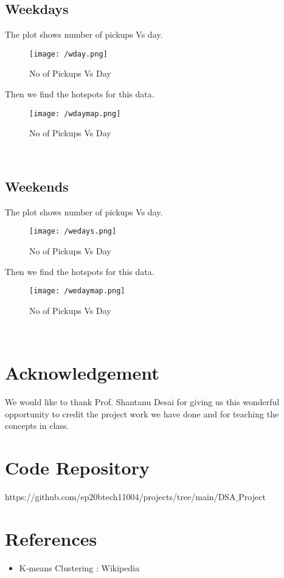 \documentclass[fleqn]{report}
\begin{document}
  	\subsection{Weekdays}
  	The plot shows number of pickups Vs day.
  	 \begin{figure}[!ht]
  		\centering
  		\texttt{[image: /wday.png]}
  		\caption{No of Pickups Vs Day}
  		\label{fig:wday}
  	\end{figure} 
  	Then we find the hotspots for this data.
  	  	 \begin{figure}[!ht]
  		\centering
  		\texttt{[image: /wdaymap.png]}
  		\caption{No of Pickups Vs Day}
  		\label{fig:wdaymap}
  	\end{figure}\\ 
  	  	\subsection{Weekends}
  	The plot shows number of pickups Vs day.
  	\begin{figure}[!ht]
  		\centering
  		\texttt{[image: /wedays.png]}
  		\caption{No of Pickups Vs Day}
  		\label{fig:weday}
  	\end{figure} 
  	Then we find the hotspots for this data.
  	\begin{figure}[!ht]
  		\centering
  		\texttt{[image: /wedaymap.png]}
  		\caption{No of Pickups Vs Day}
  		\label{fig:wedaymap}
  	\end{figure} \\
	\section{Acknowledgement}
	We would like to thank Prof. Shantanu Desai for giving us this wonderful opportunity to credit the
	project work we have done and for teaching the concepts in class.
	\section{Code Repository}
	https://github.com/ep20btech11004/projects/tree/main/DSA$\_$Project
	\section{References}
	\begin{itemize}
		\item K-means Clustering : Wikipedia 
	\end{itemize}
	 

	
\end{document}
